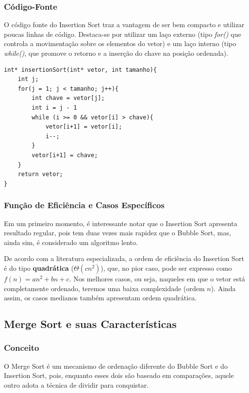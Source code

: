 \documentclass[a4paper, 12pt]{article}
\begin{document}
\subsubsection{Código-Fonte} 
\tab{} O código fonte do Insertion Sort traz a vantagem de ser bem compacto e utilizar poucas linhas de código. Destaca-se por utilizar um laço externo (tipo \textit{for()} que controla a movimentação sobre os elementos do vetor) e um laço interno (tipo \textit{while()}, que promove o retorno e a inserção do chave na posição ordenada).
\begin{verbatim}
int* insertionSort(int* vetor, int tamanho){
    int j;
    for(j = 1; j < tamanho; j++){
        int chave = vetor[j];               
        int i = j - 1                       
        while (i >= 0 && vetor[i] > chave){                                             
            vetor[i+1] = vetor[i];
            i--;
        }
        vetor[i+1] = chave;
    }	
    return vetor;
}
\end{verbatim}

\subsubsection{Função de Eficiência e Casos Específicos}
Em um primeiro momento, é interessante notar que o Insertion Sort apresenta resultado regular, pois tem duas vezes mais rapidez que o Bubble Sort, mas, ainda sim, é considerado um algoritmo lento.

De acordo com a literatura especializada, a ordem de eficiência do Insertion Sort é do tipo \textbf{quadrática} ($\varTheta(cn^2)$), que, no pior caso, pode ser expresso como $f(n) = an^{2} + bn + c$. Nos melhores casos, ou seja, naqueles em que o vetor está completamente ordenado, teremos uma baixa complexidade (ordem $n$). Ainda assim, os casos medianos também apresentam ordem quadrática.

\vspace{0.9cm}
\subsection{Merge Sort e suas Características}
\subsubsection{Conceito}

O Merge Sort é um mecanismo de ordenação diferente do Bubble Sort e do Insertion Sort, pois, enquanto esses dois são baseado em comparações, aquele outro adota a técnica de dividir para conquistar.
\end{document}
